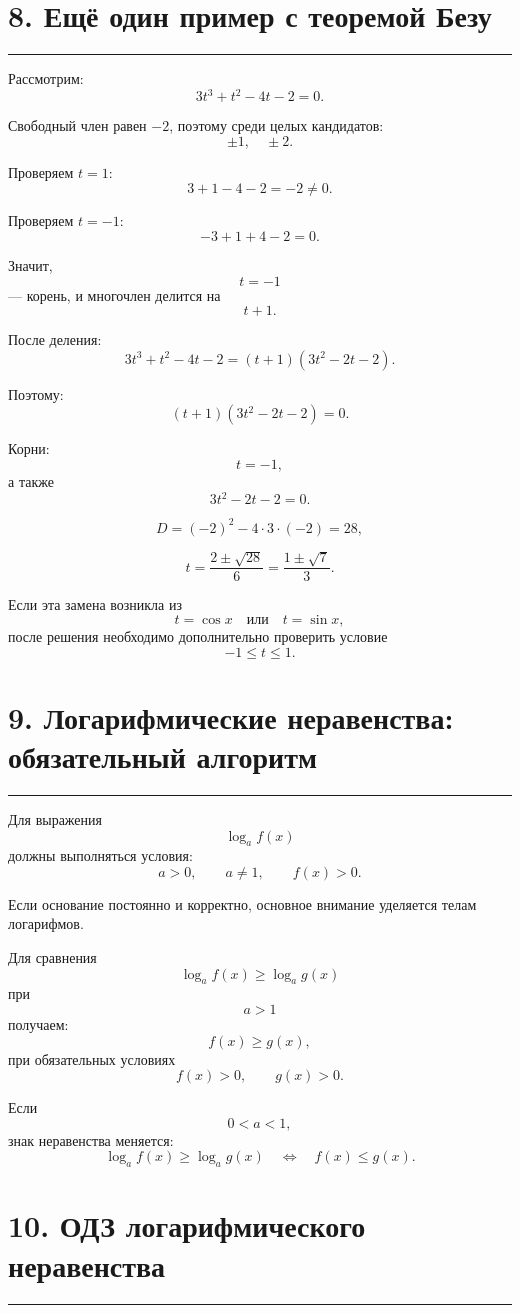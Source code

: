 \documentclass[a4paper,12pt]{article}
\newcommand{\sectionline}{%
    \vspace{0.2em}
    \noindent\color{linegray}\rule{\linewidth}{0.6pt}
    \vspace{0.4em}
}
\begin{document}
\section*{\color{darkaccent}8. Ещё один пример с теоремой Безу}
\sectionline

Рассмотрим:
\[
3t^3+t^2-4t-2=0.
\]

Свободный член равен \(-2\), поэтому среди целых кандидатов:
\[
\pm1,\quad\pm2.
\]

Проверяем \(t=1\):
\[
3+1-4-2=-2\ne0.
\]

Проверяем \(t=-1\):
\[
-3+1+4-2=0.
\]

Значит,
\[
t=-1
\]
--- корень, и многочлен делится на
\[
t+1.
\]

После деления:
\[
3t^3+t^2-4t-2
=
(t+1)(3t^2-2t-2).
\]

Поэтому:
\[
(t+1)(3t^2-2t-2)=0.
\]

Корни:
\[
t=-1,
\]
а также
\[
3t^2-2t-2=0.
\]

\[
D=(-2)^2-4\cdot3\cdot(-2)=28,
\]

\[
t=\frac{2\pm\sqrt{28}}{6}
=
\frac{1\pm\sqrt7}{3}.
\]

Если эта замена возникла из
\[
t=\cos x
\quad\text{или}\quad
t=\sin x,
\]
после решения необходимо дополнительно проверить условие
\[
-1\le t\le1.
\]

\section*{\color{darkaccent}9. Логарифмические неравенства: обязательный алгоритм}
\sectionline

Для выражения
\[
\log_a f(x)
\]
должны выполняться условия:
\[
a>0,\qquad a\ne1,\qquad f(x)>0.
\]

Если основание постоянно и корректно, основное внимание уделяется телам логарифмов.

Для сравнения
\[
\log_a f(x)\ge\log_a g(x)
\]
при
\[
a>1
\]
получаем:
\[
f(x)\ge g(x),
\]
при обязательных условиях
\[
f(x)>0,\qquad g(x)>0.
\]

Если
\[
0<a<1,
\]
знак неравенства меняется:
\[
\log_a f(x)\ge\log_a g(x)
\quad\Longleftrightarrow\quad
f(x)\le g(x).
\]

\section*{\color{darkaccent}10. ОДЗ логарифмического неравенства}
\sectionline
\end{document}

